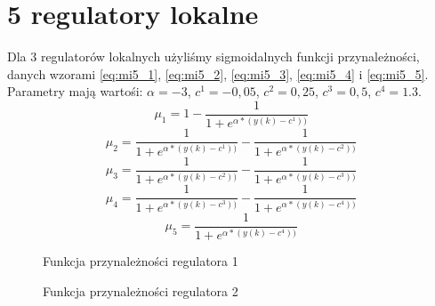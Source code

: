 \section{5 regulatory lokalne}
Dla 3 regulatorów lokalnych użyliśmy sigmoidalnych funkcji przynależności, danych wzorami \ref{eq:mi5_1}, \ref{eq:mi5_2}, \ref{eq:mi5_3}, \ref{eq:mi5_4} i \ref{eq:mi5_5}. Parametry mają wartośi: $\alpha = -3$, $c^1 = -0,05$, $c^2=0,25$, $c^3=0,5$, $c^4=1.3$.
\begin{equation} \label{eq:mi5_1}
\mu_1 = 1 - \frac{1}{1+e^{\alpha * (y(k)-c^1))}}
\end{equation}
\begin{equation} \label{eq:mi5_2}
\mu_2 = \frac{1}{1+e^{\alpha * (y(k)-c^1))}} - \frac{1}{1+e^{\alpha * (y(k)-c^2))}}
\end{equation}
\begin{equation} \label{eq:mi5_3}
\mu_3 = \frac{1}{1+e^{\alpha * (y(k)-c^2))}} - \frac{1}{1+e^{\alpha * (y(k)-c^3))}}
\end{equation}
\begin{equation} \label{eq:mi5_4}
\mu_4 = \frac{1}{1+e^{\alpha * (y(k)-c^3))}} - \frac{1}{1+e^{\alpha * (y(k)-c^4))}}
\end{equation}
\begin{equation} \label{eq:mi5_5}
\mu_5 = \frac{1}{1+e^{\alpha * (y(k)-c^4))}}
\end{equation}

\begin{figure}[H]
\centering
{}
\caption{Funkcja przynależności regulatora 1}
\label{fig:mi5_1}
\end{figure}

\begin{figure}[H]
\centering
{}
\caption{Funkcja przynależności regulatora 2}
\label{fig:mi5_2}
\end{figure}

